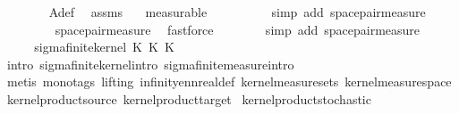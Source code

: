 \begin{isabellebody}
\ \ \ \ \ \ \isamarkupfalse%
\ A{\isacharunderscore}{\kern0pt}def\ \isamarkupfalse%
\ assms\ {\isasymomega}\ \isamarkupfalse%
\ measurable\isanewline
\ \ \ \ \ \ \ \ \isamarkupfalse%
\ {\isacharparenleft}{\kern0pt}simp\ add{\isacharcolon}{\kern0pt}\ space{\isacharunderscore}{\kern0pt}pair{\isacharunderscore}{\kern0pt}measure{\isacharparenright}{\kern0pt}\isanewline
\ \ \ \ \ \ \isamarkupfalse%
\ {\isachardoublequoteopen}{\isacharasterisk}{\kern0pt}{\isachardoublequoteclose}\ space{\isacharunderscore}{\kern0pt}pair{\isacharunderscore}{\kern0pt}measure\ \isamarkupfalse%
\ fastforce\isanewline
\ \ \ \ \ \ \isamarkupfalse%
\ {\isacharparenleft}{\kern0pt}simp\ add{\isacharcolon}{\kern0pt}\ space{\isacharunderscore}{\kern0pt}pair{\isacharunderscore}{\kern0pt}measure{\isacharparenright}{\kern0pt}\isanewline
\ \ \isacommand{{\isacharbraceright}{\kern0pt}}\isamarkupfalse%
\isanewline
\ \ \isamarkupfalse%
\ \isamarkupfalse%
\ {\isachardoublequoteopen}sigma{\isacharunderscore}{\kern0pt}finite{\isacharunderscore}{\kern0pt}kernel\ {\isacharparenleft}{\kern0pt}K{\isacharunderscore}{\kern0pt}{}\ {\isasymOtimes}\isactrlsub K\ K{\isacharunderscore}{\kern0pt}{}{\isacharparenright}{\kern0pt}{\isachardoublequoteclose}\isanewline
\ \ \ \ \isamarkupfalse%
\ {\isacharparenleft}{\kern0pt}intro\ sigma{\isacharunderscore}{\kern0pt}finite{\isacharunderscore}{\kern0pt}kernel{\isachardot}{\kern0pt}intro\ sigma{\isacharunderscore}{\kern0pt}finite{\isacharunderscore}{\kern0pt}measure{\isachardot}{\kern0pt}intro{\isacharparenright}{\kern0pt}\isanewline
\ \ \ \ \isamarkupfalse%
\ {\isacharparenleft}{\kern0pt}metis\ {\isacharparenleft}{\kern0pt}mono{\isacharunderscore}{\kern0pt}tags{\isacharcomma}{\kern0pt}\ lifting{\isacharparenright}{\kern0pt}\ infinity{\isacharunderscore}{\kern0pt}ennreal{\isacharunderscore}{\kern0pt}def\ kernel{\isacharunderscore}{\kern0pt}measure{\isacharunderscore}{\kern0pt}sets\ kernel{\isacharunderscore}{\kern0pt}measure{\isacharunderscore}{\kern0pt}space\ kernel{\isacharunderscore}{\kern0pt}product{\isacharunderscore}{\kern0pt}source\ kernel{\isacharunderscore}{\kern0pt}product{\isacharunderscore}{\kern0pt}target{\isacharparenright}{\kern0pt}\isanewline
{}\isamarkupfalse%
%
\endisatagproof
{\isafoldproof}%
%
\isadelimproof
\isanewline
%
\endisadelimproof
\isanewline
{}\isamarkupfalse%
\ kernel{\isacharunderscore}{\kern0pt}product{\isacharunderscore}{\kern0pt}stochastic{\isacharcolon}{\kern0pt}\ \ \ \ \isanewline

\end{isabellebody}
